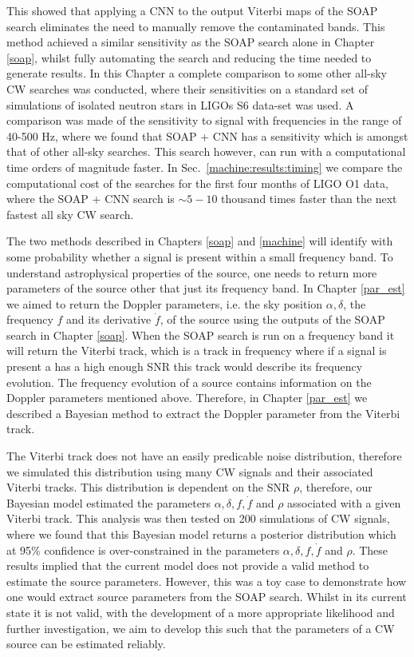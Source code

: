 This showed that applying a \gls{CNN} to the output Viterbi maps of the SOAP search eliminates the need to manually remove the contaminated bands.
This method achieved a similar sensitivity as the SOAP search alone in Chapter \ref{soap}, whilst fully automating the search and reducing the time needed to generate results.
In this Chapter a complete comparison to some other all-sky \gls{CW} searches was conducted, where their sensitivities on a standard set of simulations of isolated neutron stars in \glspl{LIGO} S6 data-set was used.
A comparison was made of the sensitivity to signal with frequencies in the range of 40-500 Hz, where we found that SOAP + \gls{CNN} has a sensitivity which is amongst that of other all-sky searches.
This search however, can run with a computational time orders of magnitude faster. In Sec.~\ref{machine:results:timing} we compare the computational cost of the searches for the first four months of \gls{LIGO} O1 data, where the SOAP + \gls{CNN} search is $\sim 5 - 10$ thousand times faster than the next fastest all sky \gls{CW} search.

\bigskip

The two methods described in Chapters \ref{soap} and \ref{machine} will identify with some probability whether a signal is present within a small frequency band.
To understand astrophysical properties of the source, one needs to return more parameters of the source other that just its frequency band.
In Chapter \ref{par_est} we aimed to return the Doppler parameters, i.e. the sky position $\alpha, \delta$, the frequency $f$ and its derivative $\dot{f}$, of the source using the outputs of the SOAP search in Chapter \ref{soap}.
When the SOAP search is run on a frequency band it will return the Viterbi track, which is a track in frequency where if a signal is present a has a high enough \gls{SNR} this track would describe its frequency evolution.
The frequency evolution of a source contains information on the Doppler parameters mentioned above. 
Therefore, in Chapter \ref{par_est} we described a Bayesian method to extract the Doppler parameter from the Viterbi track.

The Viterbi track does not have an easily predicable noise distribution, therefore we simulated this distribution using many \gls{CW} signals and their associated Viterbi tracks.
This distribution is dependent on the \gls{SNR} $\rho$, therefore, our Bayesian model estimated the parameters $\alpha, \delta, f, \dot{f}$ and $\rho$ associated with a given Viterbi track.
This analysis was then tested on 200 simulations of \gls{CW} signals, where we found that this Bayesian model returns a posterior distribution which at 95\% confidence is over-constrained in the parameters $\alpha,\delta,f,\dot{f}$ and $\rho$.
These results implied that the current model does not provide a valid method to estimate the source parameters.
However, this was a toy case to demonstrate how one would extract source parameters from the SOAP search.
Whilst in its current state it is not valid, with the development of a more appropriate likelihood and further investigation, we aim to develop this such that the parameters of a \gls{CW} source can be estimated reliably. 

